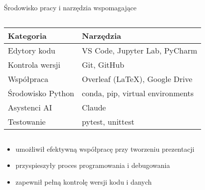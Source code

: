 \begin{frame}{Środowisko pracy i narzędzia wspomagające}
    \begin{columns}[T]
        \begin{column}{\textwidth}
            \begin{table}[h]
                \footnotesize
                \begin{tabular}{lp{8cm}}
                    \toprule
                    \textbf{Kategoria} & \textbf{Narzędzia} \\
                    \midrule
                    Edytory kodu & VS Code, Jupyter Lab, PyCharm \\
                    Kontrola wersji & Git, GitHub \\
                    Współpraca & Overleaf (LaTeX), Google Drive \\
                    Środowisko Python & conda, pip, virtual environments \\
                    Asystenci AI & Claude \\
                    Testowanie & pytest, unittest \\
                    \bottomrule
                \end{tabular}
            \end{table}
        \end{column}
    \end{columns}
    
    \vspace{0.5cm}
    
    \begin{itemize}
        \item {} umożliwił efektywną współpracę przy tworzeniu prezentacji
        \item {} przyspieszyły proces programowania i debugowania
        \item {} zapewnił pełną kontrolę wersji kodu i danych
    \end{itemize}
\end{frame}

